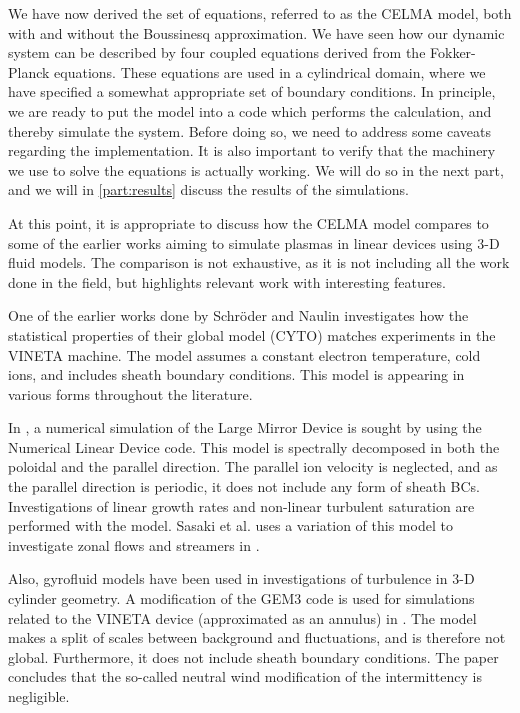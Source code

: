 We have now derived the set of equations, referred to as the CELMA model, both with and without the Boussinesq approximation.
We have seen how our dynamic system can be described by four coupled equations derived from the Fokker-Planck equations.
These equations are used in a cylindrical domain, where we have specified a somewhat appropriate set of boundary conditions.
In principle, we are ready to put the model into a code which performs the calculation, and thereby simulate the system.
Before doing so, we need to address some caveats regarding the implementation.
It is also important to verify that the machinery we use to solve the equations is actually working.
We will do so in the next part, and we will in \cref{part:results} discuss the results of the simulations.

At this point, it is appropriate to discuss how the CELMA model compares to some of the earlier works aiming to simulate plasmas in linear devices using $3$-D fluid models.
The comparison is not exhaustive, as it is not including all the work done in the field, but highlights relevant work with interesting features.

One of the earlier works done by Schr{\"o}der and Naulin \cite{Schroder2003Phd} investigates how the statistical properties of their global model (CYTO) matches experiments in the VINETA machine.
The model assumes a constant electron temperature, cold ions, and includes sheath boundary conditions.
This model is appearing in various forms throughout the literature.

In \cite{Kasuya2006}, a numerical simulation of the Large Mirror Device is sought by using the Numerical Linear Device code.
This model is spectrally decomposed in both the poloidal and the parallel direction.
The parallel ion velocity is neglected, and as the parallel direction is periodic, it does not include any form of sheath BCs.
Investigations of linear growth rates and non-linear turbulent saturation are performed with the model.
Sasaki et al. uses a variation of this model to investigate zonal flows and streamers in \cite{Sasaki2014}.

Also, gyrofluid models have been used in investigations of turbulence in $3$-D cylinder geometry.
A modification of the GEM3 code is used for simulations related to the VINETA device (approximated as an annulus) in \cite{Kervalishvili2008}.
The model makes a split of scales between background and fluctuations, and is therefore not global.
Furthermore, it does not include sheath boundary conditions.
The paper concludes that the so-called neutral wind modification of the intermittency is negligible.


